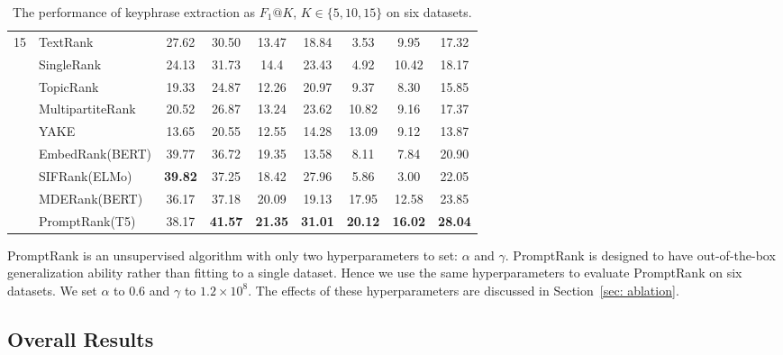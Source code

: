 \documentclass[11pt]{article}
\begin{document}
\begin{table*}[!t]
{\begin{tabular}{clccccccc}
\midrule
\midrule
\multirow{9}{*}{15} & TextRank                & 27.62  & 30.50       & 13.47       & 18.84   & 3.53     & 9.95  & 17.32                 \\
                     & SingleRank              & 24.13  & 31.73       & 14.4        & 23.43   & 4.92    & 10.42  & 18.17                 \\
                     & TopicRank               & 19.33  & 24.87       & 12.26       & 20.97   & 9.37     & 8.30  & 15.85                 \\
                     & MultipartiteRank        & 20.52  & 26.87       & 13.24       & 23.62   & 10.82     & 9.16 & 17.37                 \\
                     & YAKE                    & 13.65  & 20.55       & 12.55       & 14.28   & 13.09     & 9.12 & 13.87                 \\
                     & EmbedRank(BERT)         & 39.77  & 36.72       & 19.35       & 13.58   & 8.11     & 7.84  & 20.90                 \\
                     & SIFRank(ELMo)           & \textbf{39.82}  & 37.25       & 18.42       & 27.96   & 5.86     & 3.00  & 22.05                 \\
                     & MDERank(BERT)           & 36.17  & 37.18       & 20.09       & 19.13   & 17.95    & 12.58 & 23.85                 \\
\cmidrule{2-9}
                     & PromptRank(T5)          & 38.17  & \textbf{41.57}       & \textbf{21.35}       & \textbf{31.01}   & \textbf{20.12}    & \textbf{16.02} & \textbf{28.04}                 \\
\bottomrule
\end{tabular}}
\caption{The performance of keyphrase extraction as $F_{1}@K$, $K \in \{5, 10, 15\}$ on six datasets.} \label{tb: results}
\end{table*}




PromptRank is an unsupervised algorithm with only two hyperparameters to set:  $\alpha$ and $\gamma$. PromptRank is designed to have out-of-the-box generalization ability rather than fitting to a single dataset. Hence we use the same hyperparameters to evaluate PromptRank on six datasets. We set $\alpha$ to 0.6 and $\gamma$ to $1.2 \times 10^{8}$. The effects of these hyperparameters are discussed in Section~\ref{sec: ablation}.


\subsection{Overall Results}
\end{document}
